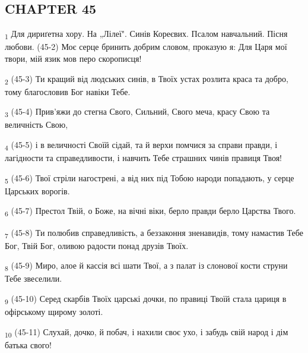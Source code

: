 \subsection{CHAPTER 45}
\begin{tcolorbox}
\textsubscript{1} Для дириґетна хору. На „Лілеї". Синів Кореєвих. Псалом навчальний. Пісня любови. (45-2) Моє серце бринить добрим словом, проказую я: Для Царя мої твори, мій язик мов перо скорописця!
\end{tcolorbox}
\begin{tcolorbox}
\textsubscript{2} (45-3) Ти кращий від людських синів, в Твоїх устах розлита краса та добро, тому благословив Бог навіки Тебе.
\end{tcolorbox}
\begin{tcolorbox}
\textsubscript{3} (45-4) Прив'яжи до стегна Свого, Сильний, Свого меча, красу Свою та величність Свою,
\end{tcolorbox}
\begin{tcolorbox}
\textsubscript{4} (45-5) і в величності Своїй сідай, та й верхи помчися за справи правди, і лагідности та справедливости, і навчить Тебе страшних чинів правиця Твоя!
\end{tcolorbox}
\begin{tcolorbox}
\textsubscript{5} (45-6) Твої стріли нагострені, а від них під Тобою народи попадають, у серце Царських ворогів.
\end{tcolorbox}
\begin{tcolorbox}
\textsubscript{6} (45-7) Престол Твій, о Боже, на вічні віки, берло правди берло Царства Твого.
\end{tcolorbox}
\begin{tcolorbox}
\textsubscript{7} (45-8) Ти полюбив справедливість, а беззаконня зненавидів, тому намастив Тебе Бог, Твій Бог, оливою радости понад друзів Твоїх.
\end{tcolorbox}
\begin{tcolorbox}
\textsubscript{8} (45-9) Миро, алое й кассія всі шати Твої, а з палат із слонової кости струни Тебе звеселили.
\end{tcolorbox}
\begin{tcolorbox}
\textsubscript{9} (45-10) Серед скарбів Твоїх царські дочки, по правиці Твоїй стала цариця в офірському щирому золоті.
\end{tcolorbox}
\begin{tcolorbox}
\textsubscript{10} (45-11) Слухай, дочко, й побач, і нахили своє ухо, і забудь свій народ і дім батька свого!
\end{tcolorbox}
